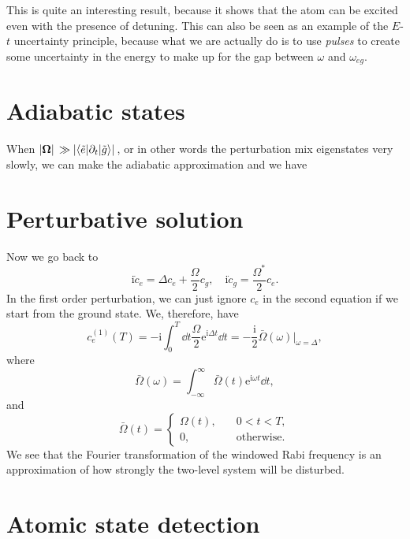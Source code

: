\documentclass[hyperref, a4paper]{article}
\newcommand*{\ii}{\mathrm{i}}
\newcommand*{\ee}{\mathrm{e}}
\begin{document}
This is quite an interesting result, because it shows that the atom can be excited even with the presence of detuning.
This can also be seen as an example of the $E$-$t$ uncertainty principle, because what we are actually do is to use \emph{pulses} to create some uncertainty in the energy to make up for the gap between $\omega$ and $\omega_{eg}$.

\section{Adiabatic states}

When $\abs*{\vb*{\Omega}} \gg \abs*{\mel**{\tilde{e}}{\partial_t}{\tilde{g}}}$, or in other words the perturbation mix eigenstates very slowly, we can make the adiabatic approximation and we have 

\section{Perturbative solution}

Now we go back to 
\begin{equation}
    \ii \dot{c}_e = \Delta c_e + \frac{\Omega}{2} c_g, \quad \ii \dot{c}_g = \frac{\Omega^*}{2} c_e.
\end{equation}
In the first order perturbation, we can just ignore $c_e$ in the second equation if we start from the ground state.
We, therefore, have 
\begin{equation}
    c^{(1)}_e(T) = - \ii \int_0^T \dd{t} \frac{\Omega}{2} \ee^{\ii \Delta t} \dd{t} = - \frac{\ii}{2} \bar{\Omega}(\omega)|_{\omega = \Delta},
\end{equation}
where 
\begin{equation}
    \bar{\Omega}(\omega) = \int_{-\infty}^\infty \bar{\Omega}(t) \ee^{\ii \omega t} \dd{t}, 
\end{equation}
and 
\begin{equation}
    \bar{\Omega}(t) = \begin{cases}
        \Omega(t) , &\quad 0 < t < T, \\
        0         , &\quad \text{otherwise}.
    \end{cases}
\end{equation}
We see that the Fourier transformation of the windowed Rabi frequency is an approximation of how strongly the two-level system will be disturbed.

\section{Atomic state detection}
\end{document}
